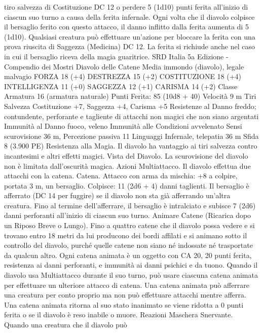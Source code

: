 \begin{multicols}{2}
tiro salvezza di Costituzione DC 12 o perdere 5 (1d10) punti
ferita all’inizio di ciascun suo turno a causa della ferita infernale.
Ogni volta che il diavolo colpisce il bersaglio ferito con questo
attacco, il danno inflitto dalla ferita aumenta di 5 (1d10).
Qualsiasi creatura può effettuare un’azione per bloccare la ferita
con una prova riuscita di Saggezza (Medicina) DC 12. La ferita
si richiude anche nel caso in cui il bersaglio riceva della magia
guaritrice. 
SRD Italia 5a Edizione - Compendio dei Mostri
Diavolo delle Catene
Media immondo (diavolo), legale malvagio
FORZA 18 (+4)
DESTREZZA 15 (+2)
COSTITUZIONE 18 (+4)
INTELLIGENZA 11 (+0)
SAGGEZZA 12 (+1)
CARISMA 14 (+2)
Classe Armatura 16 (armatura naturale)
\hspace*{0pt}\hfill{Punti Ferita}: 85 (10d8 + 40)
Velocità 9 m
Tiri Salvezza Costituzione +7, Saggezza +4, Carisma +5
Resistenze al Danno freddo; contundente, perforante e tagliente
di attacchi non magici che non siano argentati
Immunità al Danno fuoco, veleno
Immunità alle Condizioni avvelenato
Sensi scurovisione 36 m, Percezione passiva 11
Linguaggi Infernale, telepatia 36 m
Sfida 8 (3.900 PE)
Resistenza alla Magia. Il diavolo ha vantaggio ai tiri salvezza
contro incantesimi e altri effetti magici.
Vista del Diavolo. La scurovisione del diavolo non è limitata
dall’oscurità magica.
Azioni
Multiattacco. Il diavolo effettua due attacchi con la catena.
Catena. Attacco con arma da mischia: +8 a colpire, portata 3 m,
un bersaglio.
Colpisce: 11 (2d6 + 4) danni taglienti. Il bersaglio è afferrato
(DC 14 per fuggire) se il diavolo non sta già afferrando un’altra
creatura. Fino al termine dell’afferrare, il bersaglio è intralciato e
subisce 7 (2d6) danni perforanti all’inizio di ciascun suo turno.
Animare Catene (Ricarica dopo un Riposo Breve o Lungo).
Fino a quattro catene che il diavolo possa vedere e si trovano
entro 18 metri da lui producono dei bordi affilati e si animano
sotto il controllo del diavolo, purché quelle catene non siano né
indossate né trasportate da qualcun altro.
Ogni catena animata è un oggetto con CA 20, 20 punti ferita,
resistenza ai danni perforanti, e immunità ai danni psichici e da
tuono. Quando il diavolo usa Multiattacco durante il suo turno,
può usare ciascuna catena animata per effettuare un ulteriore
attacco di catena. Una catena animata può afferrare una creatura
per conto proprio ma non può effettuare attacchi mentre afferra.
Una catena animata ritorna al suo stato inanimato se viene ridotta
a 0 punti ferita o se il diavolo è reso inabile o muore.
Reazioni
Maschera Snervante. Quando una creatura che il diavolo può

\end{multicols}
